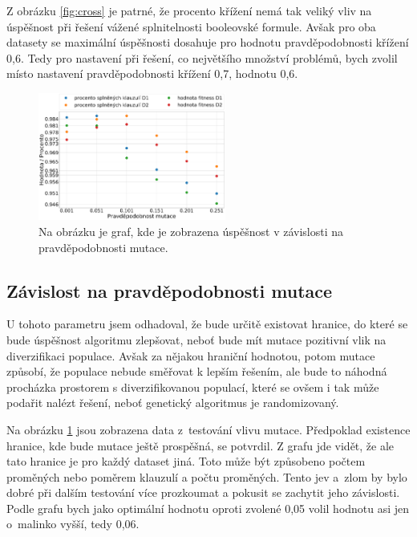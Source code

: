 \documentclass[11pt]{article}
\begin{document}
Z obrázku \ref{fig:cross} je patrné, že procento křížení nemá tak veliký vliv na úspěšnost při řešení vážené splnitelnosti booleovské formule. Avšak pro oba datasety se maximální úspěšnosti dosahuje pro hodnotu pravděpodobnosti křížení 0,6. Tedy pro nastavení při řešení, co největšího množství problémů, bych zvolil místo nastavení pravděpodobnosti křížení 0,7, hodnotu 0,6.

\begin{figure}
\begin{center}
\includegraphics[width=0.55\textwidth]{img/sat_mut.pdf} 
\caption{Na obrázku je graf, kde je zobrazena úspěšnost v závislosti na pravděpodobnosti mutace.}
\label{fig:mut}
\end{center}
\end{figure}

\subsection{Závislost na pravděpodobnosti mutace}
U tohoto parametru jsem odhadoval, že bude určitě existovat hranice, do které se bude úspěšnost algoritmu zlepšovat, neboť bude mít mutace pozitivní vlik na diverzifikaci populace. Avšak za nějakou hraniční hodnotou, potom mutace způsobí, že populace nebude směřovat k lepším řešením, ale bude to náhodná procházka prostorem s diverzifikovanou populací, které se ovšem i tak může podařit nalézt řešení, neboť genetický algoritmus je randomizovaný.

Na obrázku \ref{fig:mut} jsou zobrazena data z~testování vlivu mutace. Předpoklad existence hranice, kde bude mutace ještě prospěšná, se potvrdil. Z grafu jde vidět, že ale tato hranice je pro každý dataset jiná. Toto může být způsobeno počtem proměných nebo poměrem klauzulí a počtu proměných. Tento jev a~zlom by bylo dobré při dalším testování více prozkoumat a pokusit se zachytit jeho závislosti. Podle grafu bych jako optimální hodnotu oproti zvolené 0,05 volil hodnotu asi jen o~malinko vyšší, tedy 0,06. 
\end{document}
